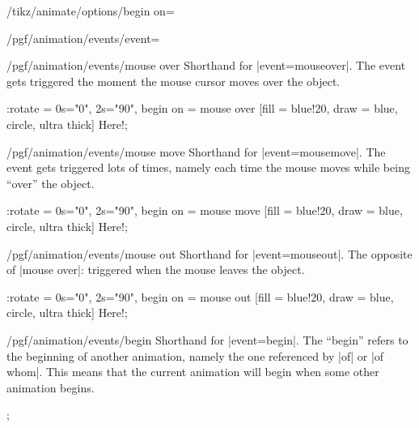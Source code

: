 \begin{key}{/tikz/animate/options/begin on=}
\begin{key}{/pgf/animation/events/event=}
        \begin{key}{/pgf/animation/events/mouse over}
            Shorthand for |event=mouseover|. The event gets triggered the
            moment the mouse cursor moves over the object.
\begin{codeexample}[width=2cm,preamble={\usetikzlibrary{animations}}]
\tikz \node :rotate = { 0s="0", 2s="90", begin on = {mouse over} }
  [fill = blue!20, draw = blue, circle, ultra thick] {Here!};
\end{codeexample}
        \end{key}
        \begin{key}{/pgf/animation/events/mouse move}
            Shorthand for |event=mousemove|. The event gets triggered lots of
            times, namely each time the mouse moves while being ``over'' the
            object.
\begin{codeexample}[width=2cm,preamble={\usetikzlibrary{animations}}]
\tikz \node :rotate = { 0s="0", 2s="90", begin on = {mouse move} }
  [fill = blue!20, draw = blue, circle, ultra thick] {Here!};
\end{codeexample}
        \end{key}
        \begin{key}{/pgf/animation/events/mouse out}
            Shorthand for |event=mouseout|. The opposite of |mouse over|:
            triggered when the mouse leaves the object.
\begin{codeexample}[width=2cm,preamble={\usetikzlibrary{animations}}]
\tikz \node :rotate = { 0s="0", 2s="90", begin on = {mouse out} }
  [fill = blue!20, draw = blue, circle, ultra thick] {Here!};
\end{codeexample}
        \end{key}
        \begin{key}{/pgf/animation/events/begin}
            Shorthand for |event=begin|. The ``begin'' refers to the beginning
            of another animation, namely the one referenced by |of| or
            |of whom|. This means that the current animation will begin when
            some other animation begins.
\begin{codeexample}[width=2cm,preamble={\usetikzlibrary{animations}}]
\tikz {};
\end{codeexample}

\end{key}
\end{key}
\end{key}
